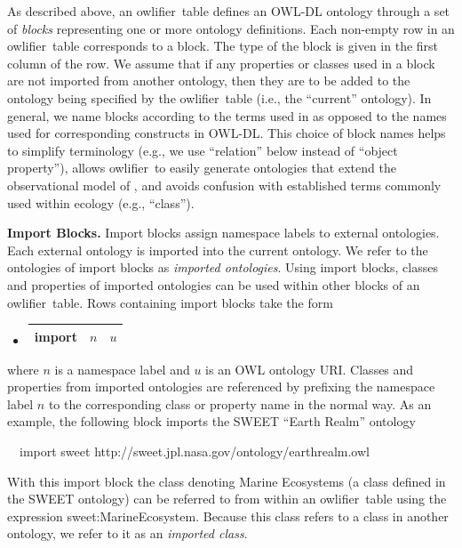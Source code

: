 \documentclass[5p,authoryear]{elsarticle}
\newcommand{\owlifier}{\textsf{owlifier}}
\newcommand{\myblock}[1]{\vspace{12pt}\noindent\textbf{#1}}
\begin{document}
As described above, an \owlifier\ table defines an OWL-DL
\cite{smith04:_owl_web_ontol_languag_guide} ontology through a set of
\emph{blocks} representing one or more ontology definitions.  Each
non-empty row in an \owlifier\ table corresponds to a block. The type
of the block is given in the first column of the row. 
We assume that if any properties or classes used in a block are not
imported from another ontology, then they are to be added to the
ontology being specified by the \owlifier\ table (i.e., the
``current'' ontology). In general, we name blocks according to the
terms used in
\cite{bowers08:_concep_model_framew_for_expres,madin07:_ontol_for_descr_and_synth}
as opposed to the names used for corresponding constructs in
OWL-DL. This choice of block names helps to simplify terminology
(e.g., we use ``relation'' below instead of ``object property''),
allows \owlifier\ to easily generate ontologies that extend the
observational model of
\cite{bowers08:_concep_model_framew_for_expres,madin07:_ontol_for_descr_and_synth},
and avoids confusion with established terms commonly used within
ecology (e.g., ``class''). 

\myblock{Import Blocks.} Import blocks assign namespace labels to
external ontologies. Each external ontology is imported into the
current ontology. We refer to the ontologies of import blocks as
\emph{imported ontologies}.  Using import blocks, classes and
properties of imported ontologies can be used within other blocks of
an \owlifier\ table.  Rows containing import blocks take the form
\begin{itemize}
\item[]
  \begin{tabular}{|l|l|l|}\hline
    \textsf{import} & $n$ & $u$ \\ \hline 
  \end{tabular} 
\end{itemize}
where $n$ is a namespace label and $u$ is an OWL ontology URI. Classes
and properties from imported ontologies are referenced by prefixing
the namespace label $n$ to the corresponding class or property name in
the normal way. As an example, the following block imports the SWEET
``Earth Realm'' ontology \cite{raskin:_seman_web_for_earth_and}
\begin{tabbing}
  ~~\textsf{import}  \textsf{sweet} 
  \textsf{http://sweet.jpl.nasa.gov/ontology/earthrealm.owl}
\end{tabbing}
With this import block the class denoting Marine Ecosystems (a class
defined in the SWEET ontology) can be referred to from within an
\owlifier\ table using the expression
\textsf{sweet:MarineEcosystem}. Because this class refers to a class
in another ontology, we refer to it as an \emph{imported class}.
\end{document}
